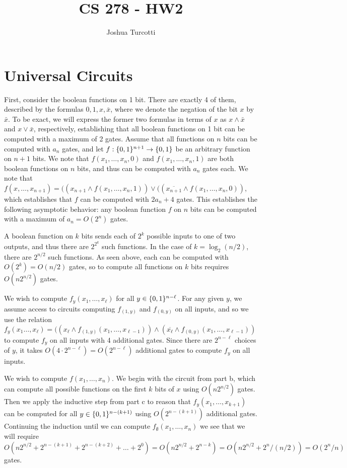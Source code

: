 \documentclass{article}
\title{CS 278 - HW2}
\author{Joshua Turcotti}
\begin{document}
\maketitle

\section{Universal Circuits}

\begin{alphalist}
\item First, consider the boolean functions on 1 bit. There are exactly 4 of them, described by the formulas $0, 1, x, \bar{x}$, where we denote the negation of the bit $x$ by $\bar{x}$. To be exact, we will express the former two formulas in terms of $x$ as $x \wedge \bar{x}$ and $x \vee \bar{x}$, respectively, establishing that all boolean functions on 1 bit can be computed with a maximum of 2 gates. Assume that all functions on $n$ bits can be computed with $a_n$ gates, and let $f: \{0, 1\}^{n+1} \to \{0, 1\}$ be an arbitrary function on $n + 1$ bits. We note that $f(x_1, \ldots, x_n, 0)$ and $f(x_1, \ldots, x_n, 1)$ are both boolean functions on $n$ bits, and thus can be computed with $a_n$ gates each. We note that $f(x, \ldots, x_{n+1}) = ((x_{n+1} \wedge f(x_1, \ldots, x_n, 1)) \vee ((\overline{x_{n+1}} \wedge f(x_1, \ldots, x_n, 0))$, which establishes that $f$ can be computed with $2a_n + 4$ gates. This establishes the following asymptotic behavior: any boolean function $f$ on $n$ bits can be computed with a maximum of $a_n = O(2^n)$ gates.
\item A boolean function on $k$ bits sends each of $2^k$ possible inputs to one of two outputs, and thus there are $2^{2^k}$ such functions. In the case of $k = \log_2(n/2)$, there are $2^{n/2}$ such functions. As seen above, each can be computed with $O(2^k) = O(n/2)$ gates, so to compute all functions on $k$ bits requires $O(n2^{n/2})$ gates.
\item We wish to compute $f_y(x_1, \ldots, x_\ell)$ for all $y \in \{0, 1\}^{n-\ell}$. For any given $y$, we assume access to circuits computing $f_{(1, y)}$ and $f_{(0, y)}$ on all inputs, and so we use the relation $f_y(x_1 \ldots, x_\ell) = ((x_\ell \wedge f_{(1, y)}(x_1, \ldots, x_{\ell - 1})) \wedge (\overline{x_\ell} \wedge f_{(0, y)}(x_1, \ldots, x_{\ell - 1}))$ to compute $f_y$ on all inputs with 4 additional gates. Since there are $2^{n- \ell}$ choices of $y$, it takes $O(4\cdot2^{n - \ell}) = O(2^{n - \ell})$ additional gates to compute $f_y$ on all inputs.
\item We wish to compute $f(x_1, \ldots, x_n)$. We begin with the circuit from part b, which can compute all possible functions on the first $k$ bits of $x$ using $O(n2^{n/2})$ gates. Then we apply the inductive step from part c to reason that $f_y(x_1, \ldots, x_{k+1})$ can be computed for all $y \in \{0, 1\}^{n - (k+1)}$ using $O(2^{n - (k + 1)})$ additional gates. Continuing the induction until we can compute $f_\emptyset(x_1, \ldots, x_n)$ we see that we will require $O(n2^{n/2} + 2^{n - (k+1)} + 2^{n - (k + 2)} + \ldots + 2^0) = O(n2^{n/2} + 2^{n - k}) = O(n2^{n/2} + 2^n/(n/2)) = O(2^n/n)$ gates.
\end{alphalist}
\end{document}
